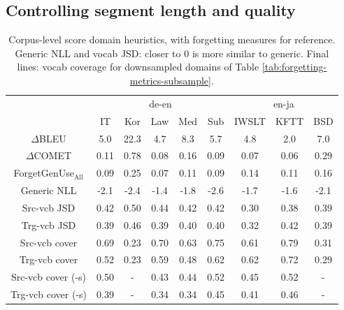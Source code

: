 \documentclass[11pt]{article}
\begin{document}
\subsection{Controlling segment length and  quality}

\begin{table*}[t]
    \centering
   \small 
    \begin{tabular}{c| ccccc| ccc|}
           &  \multicolumn{5}{c|}{de-en} &  \multicolumn{3}{c|}{en-ja}\\

         &  IT & Kor  &Law  &Med  & Sub &   IWSLT  & KFTT & BSD\\

        \hline
        $\Delta$BLEU & 5.0 &22.3  & 4.7  & 8.3 & 5.7 &  4.8 & 2.0 & 7.0  \\
         $\Delta$COMET & 0.11 & 0.78 & 0.08 & 0.16 & 0.09 & 0.07 &0.06 & 0.29 \\
        ForgetGenUse$_{\text{All}}$ &  0.09 & 0.25  & 0.07  & 0.11  & 0.09 &0.14 &0.11 & 0.16\\
         \hline
        Generic NLL & -2.1 & -2.4 & -1.4 &  -1.8 & -2.6 &   -1.7   &  -1.6 & -2.1 \\
        Src-vcb JSD & 0.42 & 0.50  & 0.44 & 0.42&0.42 &  0.30 &  0.38 & 0.39 \\
        Trg-vcb JSD & 0.39 &   0.46&   0.39&  0.40& 0.40 &  0.32  & 0.42 & 0.39 \\
        Src-vcb cover&  0.69 &0.23 & 0.70 &0.63 &0.75 &   0.61 & 0.79 & 0.31 \\
        Trg-vcb cover& 0.52  &0.23 &0.59  &0.48 & 0.62 &   0.62 & 0.72 & 0.29\\
                 \hline

         Src-vcb cover (-s)&0.50  &- & 0.43& 0.44& 0.52  & 0.45 & 0.52&- \\
         Trg-vcb cover (-s)& 0.39 &- & 0.34&0.34 & 0.45 &  0.41 & 0.46& -\\
    \end{tabular}
    \caption{Corpus-level score domain heuristics, with forgetting measures for reference. Generic NLL and vocab JSD: closer to 0 is more similar to generic. 
     Final lines: vocab coverage for downsampled  domains of Table \ref{tab:forgetting-metrics-subsample}.
    }
    \label{tab:forgetting-other-heuristics}
\end{table*}
\end{document}
